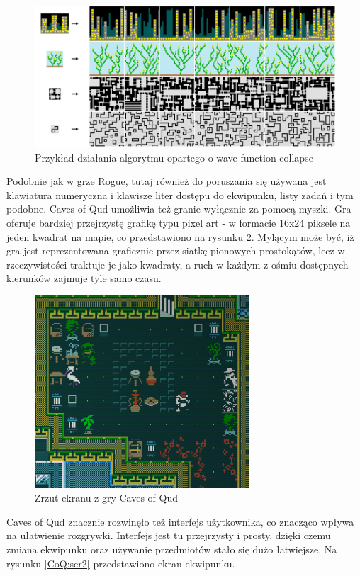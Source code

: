 \documentclass[12pt,twoside]{article}
\begin{document}
\FloatBarrier
\begin{figure}[h]
	\centering
	\includegraphics[width=12cm]{images/wfc.png}
	\caption{Przykład działania algorytmu opartego o wave function collapse}
	\label{wfc}
\end{figure}
\FloatBarrier


Podobnie jak w grze Rogue, tutaj również do poruszania się używana jest klawiatura numeryczna i klawisze liter dostępu do ekwipunku, listy zadań i tym podobne. Caves of Qud umożliwia też granie wyłącznie za pomocą myszki. Gra oferuje bardziej przejrzystę grafikę typu pixel art -  w formacie 16x24 piksele na jeden kwadrat na mapie, co przedstawiono na rysunku \ref{CoQ:scr3}. Mylącym może być, iż gra jest reprezentowana graficznie przez siatkę pionowych prostokątów, lecz w rzeczywistości traktuje je jako kwadraty, a ruch w każdym z ośmiu dostępnych kierunków zajmuje tyle samo czasu.

\FloatBarrier
\begin{figure}[h]
	\centering
	\includegraphics[width=8cm]{images/caves_of_qud/scr3.png}
	\caption{Zrzut ekranu z gry Caves of Qud}
	\label{CoQ:scr3}
\end{figure}
\FloatBarrier

Caves of Qud znacznie rozwinęło też interfejs użytkownika, co znacząco wpływa na ułatwienie rozgrywki. Interfejs jest tu przejrzysty i prosty, dzięki czemu zmiana ekwipunku oraz używanie przedmiotów stało się dużo łatwiejsze. Na rysunku \ref{CoQ:scr2} przedstawiono ekran ekwipunku.
\end{document}
